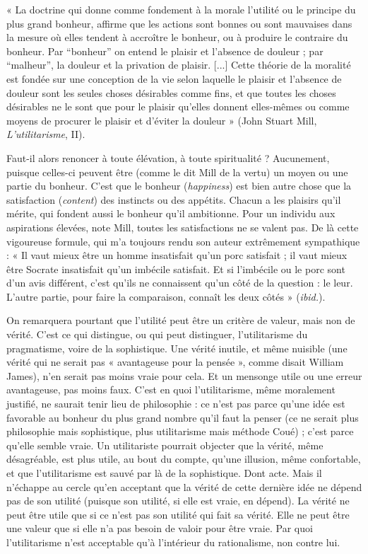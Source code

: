 « La doctrine qui donne comme fondement à la morale l'utilité ou le principe du
plus grand bonheur, affirme que les actions sont bonnes ou sont mauvaises dans la
mesure où elles tendent à accroître le bonheur, ou à produire le contraire du bonheur.
Par “bonheur” on entend le plaisir et l’absence de douleur ; par “malheur”, la douleur
et la privation de plaisir. [...] Cette théorie de la moralité est fondée sur une conception
de la vie selon laquelle le plaisir et l’absence de douleur sont les seules choses désirables
comme fins, et que toutes les choses désirables ne le sont que pour le plaisir qu’elles
donnent elles-mêmes ou comme moyens de procurer le plaisir et d’éviter la douleur »
(John Stuart Mill, {\it L'utilitarisme}, II).

Faut-il alors renoncer à toute élévation, à toute spiritualité ? Aucunement,
puisque celles-ci peuvent être (comme le dit Mill de la vertu) un moyen ou une
partie du bonheur. C’est que le bonheur ({\it happiness}) est bien autre chose que la
satisfaction ({\it content}) des instincts ou des appétits. Chacun a les plaisirs qu’il
mérite, qui fondent aussi le bonheur qu’il ambitionne. Pour un individu aux
aspirations élevées, note Mill, toutes les satisfactions ne se valent pas. De là
cette vigoureuse formule, qui m’a toujours rendu son auteur extrêmement
sympathique : « Il vaut mieux être un homme insatisfait qu’un porc satisfait ; il
vaut mieux être Socrate insatisfait qu’un imbécile satisfait. Et si l’imbécile ou le
porc sont d’un avis différent, c’est qu’ils ne connaissent qu’un côté de la
question : le leur. L’autre partie, pour faire la comparaison, connaît les deux
côtés » ({\it ibid.}).

On remarquera pourtant que l'utilité peut être un critère de valeur, mais
non de vérité. C’est ce qui distingue, ou qui peut distinguer, l’utilitarisme du
pragmatisme, voire de la sophistique. Une vérité inutile, et même nuisible (une
vérité qui ne serait pas « avantageuse pour la pensée », comme disait William
James), n’en serait pas moins vraie pour cela. Et un mensonge utile ou une
erreur avantageuse, pas moins faux. C’est en quoi l’utilitarisme, même moralement
justifié, ne saurait tenir lieu de philosophie : ce n’est pas parce qu’une
idée est favorable au bonheur du plus grand nombre qu’il faut la penser (ce ne
serait plus philosophie mais sophistique, plus utilitarisme mais méthode
Coué) ; c’est parce qu’elle semble vraie. Un utilitariste pourrait objecter que la
vérité, même désagréable, est plus utile, au bout du compte, qu’une illusion,
même confortable, et que l’utilitarisme est sauvé par là de la sophistique. Dont
acte. Mais il n’échappe au cercle qu’en acceptant que la vérité de cette dernière
idée ne dépend pas de son utilité (puisque son utilité, si elle est vraie, en
dépend). La vérité ne peut être utile que si ce n’est pas son utilité qui fait sa
vérité. Elle ne peut être une valeur que si elle n’a pas besoin de valoir pour être
vraie. Par quoi l’utilitarisme n’est acceptable qu’à l’intérieur du rationalisme,
non contre lui.

